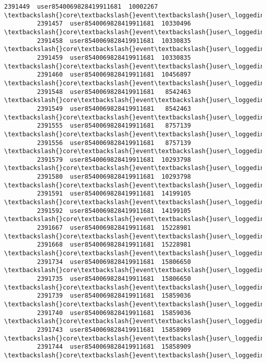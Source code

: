 \documentclass[11pt]{article}
\begin{document}
\begin{Verbatim}[commandchars=\\\{\}]
         2391449  user8540069828419911681  10002267  \textbackslash{}core\textbackslash{}event\textbackslash{}user\_loggedinas   
         2391457  user8540069828419911681  10330496  \textbackslash{}core\textbackslash{}event\textbackslash{}user\_loggedinas   
         2391458  user8540069828419911681  10330835  \textbackslash{}core\textbackslash{}event\textbackslash{}user\_loggedinas   
         2391459  user8540069828419911681  10330835  \textbackslash{}core\textbackslash{}event\textbackslash{}user\_loggedinas   
         2391460  user8540069828419911681  10456897  \textbackslash{}core\textbackslash{}event\textbackslash{}user\_loggedinas   
         2391548  user8540069828419911681   8542463  \textbackslash{}core\textbackslash{}event\textbackslash{}user\_loggedinas   
         2391549  user8540069828419911681   8542463  \textbackslash{}core\textbackslash{}event\textbackslash{}user\_loggedinas   
         2391555  user8540069828419911681   8757139  \textbackslash{}core\textbackslash{}event\textbackslash{}user\_loggedinas   
         2391556  user8540069828419911681   8757139  \textbackslash{}core\textbackslash{}event\textbackslash{}user\_loggedinas   
         2391579  user8540069828419911681  10293798  \textbackslash{}core\textbackslash{}event\textbackslash{}user\_loggedinas   
         2391580  user8540069828419911681  10293798  \textbackslash{}core\textbackslash{}event\textbackslash{}user\_loggedinas   
         2391591  user8540069828419911681  14199105  \textbackslash{}core\textbackslash{}event\textbackslash{}user\_loggedinas   
         2391592  user8540069828419911681  14199105  \textbackslash{}core\textbackslash{}event\textbackslash{}user\_loggedinas   
         2391667  user8540069828419911681  15228981  \textbackslash{}core\textbackslash{}event\textbackslash{}user\_loggedinas   
         2391668  user8540069828419911681  15228981  \textbackslash{}core\textbackslash{}event\textbackslash{}user\_loggedinas   
         2391734  user8540069828419911681  15806650  \textbackslash{}core\textbackslash{}event\textbackslash{}user\_loggedinas   
         2391735  user8540069828419911681  15806650  \textbackslash{}core\textbackslash{}event\textbackslash{}user\_loggedinas   
         2391739  user8540069828419911681  15859036  \textbackslash{}core\textbackslash{}event\textbackslash{}user\_loggedinas   
         2391740  user8540069828419911681  15859036  \textbackslash{}core\textbackslash{}event\textbackslash{}user\_loggedinas   
         2391743  user8540069828419911681  15858909  \textbackslash{}core\textbackslash{}event\textbackslash{}user\_loggedinas   
         2391744  user8540069828419911681  15858909  \textbackslash{}core\textbackslash{}event\textbackslash{}user\_loggedinas   
         

\end{Verbatim}
\end{document}
